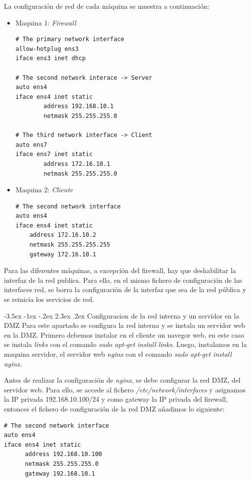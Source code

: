 \documentclass[11pt]{report} %
\makeatletter
\renewcommand\chapter{\@startsection{chapter}{0}{\z@}%
    {-3.5ex \@plus -1ex \@minus -.2ex}%
    {2.3ex \@plus.2ex}%
    {\normalfont\Large\bfseries}}
\makeatother
\begin{document}
La configuración de red de cada máquina se muestra a continuación:
\begin{itemize}
  \item Maquina 1: \emph{Firewall}
  \begin{verbatim}
# The primary network interface
allow-hotplug ens3
iface ens3 inet dhcp

# The second network interace -> Server
auto ens4
iface ens4 inet static
        address 192.168.10.1
        netmask 255.255.255.0

# The third network interface -> Client
auto ens7
iface ens7 inet static
        address 172.16.10.1
        netmask 255.255.255.0
  \end{verbatim}

  \item Maquina 2: \emph{Cliente}
  \begin{verbatim}
# The second network interface
auto ens4
iface ens4 inet static
    address 172.16.10.2
    netmask 255.255.255.255
    gateway 172.16.10.1
  \end{verbatim}
\end{itemize}

Para las diferentes máquinas, a excepción del firewall, hay que deshabilitar la interfaz de la red publica. Para ello, en el mismo fichero de configuración
de las interfaces red, se borra la configuración de la interfaz que sea de la red pública y se reinicia los servicios de red.

\cleardoublepage

\chapter{Configuracion de la red interna y un servidor en la DMZ}
Para este apartado se configura la red interna y se instala un servidor web en la DMZ. 
Primero debemos instalar en el cliente un navegor web, en este caso se instala \emph{links} 
con el comando \emph{sudo apt-get install links}. Luego, instalamos en la maquina servidor, el servidor web \emph{nginx}
con el comando \emph{sudo apt-get install nginx}. 

Antes de realizar la configuración de \emph{nginx}, se debe configurar la red DMZ, del servidor web. Para ello, se accede al fichero
\emph{/etc/network/interfaces} y asignamos la IP privada 192.168.10.100/24 y como gateway la IP privada del firewall, entonces el fichero
de configuración de la red DMZ añadimos lo siguiente:
\begin{verbatim}
# The second network interface
auto ens4
iface ens4 inet static
      address 192.168.10.100
      netmask 255.255.255.0
      gateway 192.168.10.1
\end{verbatim}
\end{document}
